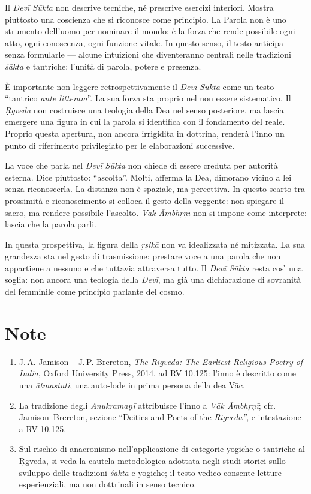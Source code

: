 Il \textit{Devī Sūkta} non descrive tecniche, né prescrive esercizi interiori. Mostra piuttosto una coscienza che si riconosce come principio. La Parola non è uno strumento dell’uomo per nominare il mondo: è la forza che rende possibile ogni atto, ogni conoscenza, ogni funzione vitale. In questo senso, il testo anticipa — senza formularle — alcune intuizioni che diventeranno centrali nelle tradizioni \textit{śākta} e tantriche: l’unità di parola, potere e presenza.

È importante non leggere retrospettivamente il \textit{Devī Sūkta }come un testo “tantrico \textit{ante litteram}”. La sua forza sta proprio nel non essere sistematico. Il \textit{Ṛgveda} non costruisce una teologia della Dea nel senso posteriore, ma lascia emergere una figura in cui la parola si identifica con il fondamento del reale. Proprio questa apertura, non ancora irrigidita in dottrina, renderà l’inno un punto di riferimento privilegiato per le elaborazioni successive.

La voce che parla nel \textit{Devī Sūkta} non chiede di essere creduta per autorità esterna. Dice piuttosto: “ascolta”. Molti, afferma la Dea, dimorano vicino a lei senza riconoscerla. La distanza non è spaziale, ma percettiva. In questo scarto tra prossimità e riconoscimento si colloca il gesto della veggente: non spiegare il sacro, ma rendere possibile l’ascolto. \textit{Vāk Āmbhṛṇī} non si impone come interprete: lascia che la parola parli.

In questa prospettiva, la figura della \textit{ṛṣikā} non va idealizzata né mitizzata. La sua grandezza sta nel gesto di trasmissione: prestare voce a una parola che non appartiene a nessuno e che tuttavia attraversa tutto. Il \textit{Devī Sūkta} resta così una soglia: non ancora una teologia della \textit{Devī}, ma già una dichiarazione di sovranità del femminile come principio parlante del cosmo.

\section*{Note}

\begin{enumerate}
\item J.\,A. Jamison – J.\,P. Brereton, \textit{The Rigveda: The Earliest Religious Poetry of India}, Oxford University Press, 2014, ad RV 10.125: l’inno è descritto come una \textit{ātmastuti}, una auto-lode in prima persona della dea Vāc.
\item La tradizione degli \textit{Anukramaṇī} attribuisce l’inno a \textit{Vāk Āmbhṛṇī}; cfr. Jamison–Brereton, sezione “Deities and Poets of the \textit{Rigveda”}, e intestazione a RV 10.125.
\item Sul rischio di anacronismo nell’applicazione di categorie yogiche o tantriche al Ṛgveda, si veda la cautela metodologica adottata negli studi storici sullo sviluppo delle tradizioni \textit{śākta} e yogiche; il testo vedico consente letture esperienziali, ma non dottrinali in senso tecnico.
\end{enumerate}
